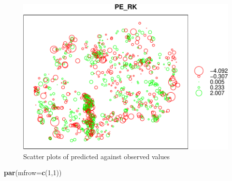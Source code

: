 \documentclass[10pt,b5paper,]{book}
\newenvironment{Shaded}{\begin{snugshade}}{\end{snugshade}}
\newcommand{\CommentTok}[1]{\textcolor[rgb]{0.56,0.35,0.01}{\textit{#1}}}
\newcommand{\DataTypeTok}[1]{\textcolor[rgb]{0.13,0.29,0.53}{#1}}
\newcommand{\DecValTok}[1]{\textcolor[rgb]{0.00,0.00,0.81}{#1}}
\newcommand{\KeywordTok}[1]{\textcolor[rgb]{0.13,0.29,0.53}{\textbf{#1}}}
\newcommand{\NormalTok}[1]{#1}
\newcommand{\OperatorTok}[1]{\textcolor[rgb]{0.81,0.36,0.00}{\textbf{#1}}}
\newcommand{\StringTok}[1]{\textcolor[rgb]{0.31,0.60,0.02}{#1}}
\theoremstyle{definition}
\theoremstyle{definition}
\theoremstyle{definition}
\theoremstyle{remark}
\begin{document}
\begin{figure}
\centering
\includegraphics{SOCMapping_files/figure-latex/unnamed-chunk-88-1.pdf}
\caption{\label{fig:unnamed-chunk-88}Scatter plots of predicted against
observed values}
\end{figure}

\begin{Shaded}
\begin{Highlighting}[]
\KeywordTok{par}\NormalTok{(}\DataTypeTok{mfrow=}\KeywordTok{c}\NormalTok{(}\DecValTok{1}\NormalTok{,}\DecValTok{1}\NormalTok{))}
\end{Highlighting}
\end{Shaded}

\begin{Shaded}
\end{Shaded}
\end{document}
